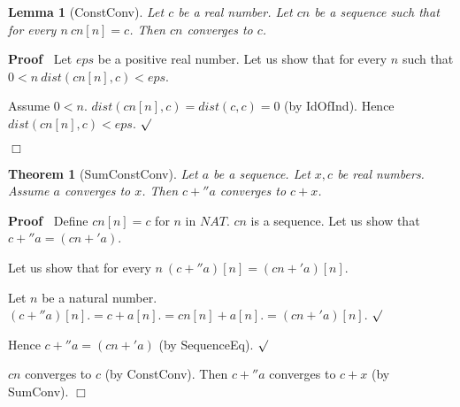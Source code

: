 \documentclass{article}
\newenvironment{forthel}{\begin{leftbar}}{\end{leftbar}}
\newenvironment{proof}{\noindent\textbf{Proof\ }}{\hspace*{\fill}$\Box$\medskip}
\newenvironment{subproof}{\begin{list}{}{}
		\item[\text{Proof}]}{\hfill $\surd$ \end{list}}
\newtheorem{lemma}{Lemma}
\newtheorem{theorem}{Theorem}
\begin{document}
\begin{forthel}
	\begin{lemma} [ConstConv]
	Let $c$ be a real number. Let $cn$ be a sequence such that for every $n \ cn[n] = c$.
	Then $cn$ converges to $c$.
	\end{lemma}
	\begin{proof}
	Let $eps$ be a positive real number.
	Let us show that for every $n$ such that $0 < n \ dist(cn[n],c) < eps$.
	\begin{subproof}
	Assume $0 < n$.
	$dist(cn[n],c) = dist(c,c) = 0$ (by IdOfInd).
	Hence $dist(cn[n],c) < eps$.
	\end{subproof}
	\end{proof}
	
	\begin{theorem} [SumConstConv]
	Let $a$ be a sequence. Let $x,c$ be real numbers. Assume $a$ converges to $x$.
	Then $c +'' a$ converges to $c + x$.
	\end{theorem}
	\begin{proof}
	Define $cn[n] = c$ for $n$ in $NAT$.
	$cn$ is a sequence.
	Let us show that $c +'' a = (cn +' a)$.
	\begin{subproof}
	Let us show that for every $n \ (c +'' a)[n] = (cn +' a)[n]$.
	\begin{subproof}
	Let $n$ be a natural number.
	$(c +'' a)[n] .= c + a[n]
	.= cn[n] + a[n]
	.= (cn +' a)[n]$.
	\end{subproof}
	Hence $c +'' a = (cn +' a)$ (by SequenceEq).
	\end{subproof}
	$cn$ converges to $c$ (by ConstConv).
	Then $c +'' a$ converges to $c + x$ (by SumConv).
	\end{proof}
	

\end{forthel}
\end{document}
